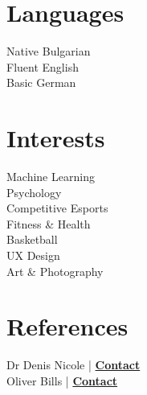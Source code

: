 \documentclass[]{resume}
\begin{document}
\begin{minipage}[t]{0.30\textwidth}
\section{Languages}
Native Bulgarian\\
Fluent English\\
Basic German

\sectionsep

\section{Interests}

Machine Learning\\
Psychology\\
Competitive Esports\\
Fitness \& Health\\
Basketball\\
UX Design\\
Art \& Photography

\sectionsep
\section{References}

Dr Denis Nicole | \href{http://www.hpcc.ecs.soton.ac.uk/dan/}{\bf Contact}\\
Oliver Bills | \href{https://www.ecs.soton.ac.uk/people/ob1a12}{\bf Contact}

\end{minipage}
\end{document}
